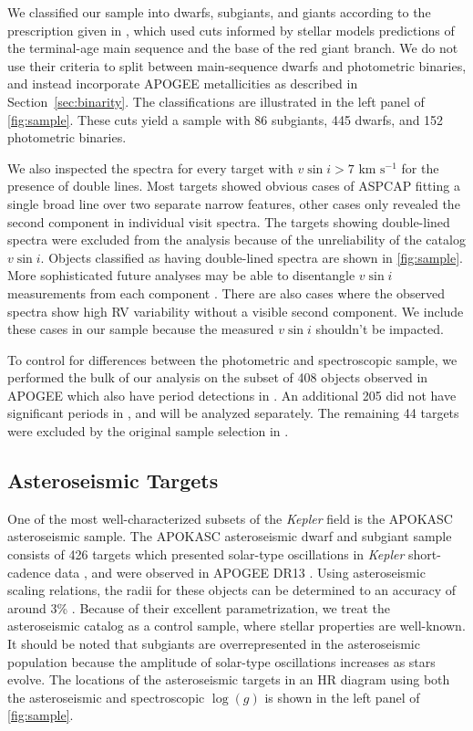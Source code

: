 \documentclass[manuscript]{aastex6}
\newcommand{\vsini}{\ensuremath{v \sin i}}
\newcommand{\Kepler}{\mbox{\textit{Kepler}}}
\newcommand{\logg}{\ensuremath{\log(g)}}
\newcommand{\kms}{\textrm{~km~s}\ensuremath{^{-1}}}
\begin{document}
We classified our sample into dwarfs, subgiants, and giants according to
the prescription given in \citep{Berger18b}, which used cuts informed by
stellar models predictions of the terminal-age main sequence and the base of
the red giant branch. We do not use their criteria to split between
main-sequence dwarfs and photometric binaries, and instead incorporate APOGEE
metallicities as described in Section~\ref{sec:binarity}. The classifications 
are illustrated
in the left panel of \cref{fig:sample}. These cuts yield a sample with 86
subgiants, 445 dwarfs, and 152 photometric binaries.

We also inspected the spectra for every target with \(\vsini > 7 \kms\)
for the presence of double lines. Most targets showed obvious cases of ASPCAP 
fitting a single broad line over two separate narrow features, other cases 
only revealed the second component in individual visit spectra. The targets 
showing double-lined spectra were excluded from the analysis because of
the unreliability of the catalog \vsini{}. Objects classified as having
double-lined spectra are shown in \cref{fig:sample}. More sophisticated future
analyses may be able to disentangle \vsini{} measurements from each component 
\citep{ElBadry18}. There are
also cases where the observed spectra show high RV variability
without a visible second component. We include these cases in our sample
because the measured \vsini{} shouldn't be impacted.

To control for differences between the photometric and spectroscopic sample,
we performed the bulk of our analysis on the subset of 408 objects
observed in APOGEE which also have period detections in \citet{McQuillan14}.
An additional 205 did not have significant periods in \citet{McQuillan14}, and
will be analyzed separately. The remaining 44 targets were excluded by
the original sample selection in \citet{McQuillan14}. 




\subsection{Asteroseismic Targets}

One of the most well-characterized subsets of the \Kepler{} field is the
APOKASC asteroseismic sample. The APOKASC asteroseismic dwarf and subgiant 
sample consists of 426 targets which presented solar-type oscillations in 
\Kepler{} short-cadence data \citep{Chaplin11}, and were observed in APOGEE DR13
\citep{Majewski17}. Using asteroseismic scaling relations, the radii
for these objects can be determined to an accuracy of around 3\%
\citep{Serenelli17}. Because of their excellent parametrization, we treat the
asteroseismic catalog as a control sample, where stellar properties are
well-known. It should be noted that subgiants are overrepresented in
the asteroseismic population because the amplitude of solar-type oscillations 
increases as stars evolve. The locations of the asteroseismic targets in an HR
diagram using both the asteroseismic and spectroscopic \logg{} is shown in 
the left panel of \cref{fig:sample}.
\end{document}
